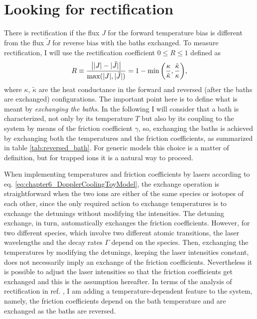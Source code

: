 \section{Looking for rectification\label{sec:lookingForR}}
%
%
There is rectification if the flux $J$  for the forward temperature bias is different from the flux $\tilde{J}$ for reverse bias
with the baths exchanged.  To measure rectification, I will use the rectification coefficient $0\le R\le 1$ defined as
%
\begin{equation}
  R \equiv \frac{\abs{|J|-|\tilde{J}|}}{\max(|J|,|\tilde{J}|)}
  = 1 - \min{ \left( \frac{\kappa}{\tilde{\kappa}} , \frac{\tilde{\kappa}}{\kappa} \right) },
  \label{eq:chapter6_Rectification}
\end{equation}
%
where $\kappa$, $\tilde{\kappa}$ are the heat conductance in the forward and reversed (after the baths are exchanged) configurations. The important point here is to define what is meant by \textit{exchanging the baths}. In the following I will consider that a bath is characterized, not only by its temperature $T$ but also by its coupling  to the system by means of the friction coefficient $\gamma$, so, exchanging the baths is achieved by exchanging both the temperatures and the friction coefficients, as summarized in table \ref{tab:reversed_bath}. For generic models this
choice is a matter of definition, but for trapped ions it is a natural way to proceed.

When implementing temperatures and friction coefficients by lasers according to
eq. \eqref{eq:chapter6_DopplerCoolingToyModel}, the exchange operation is straightforward when the two ions are either of the same species or isotopes of each other, since the only required action to exchange temperatures is to exchange the detunings without modifying the intensities. The detuning exchange, in turn, automatically exchanges the friction coefficients. However, for two different species, which involve two different atomic transitions, the laser wavelengths and the decay rates $\Gamma$ depend on the species. Then, exchanging the temperatures by modifying the detunings, keeping the laser intensities constant, does not necessarily imply an exchange of the friction coefficients. Nevertheless it is possible to adjust the laser intensities so that the friction coefficients get exchanged and this is the assumption hereafter. In terms of the analysis of rectification in ref. \cite{Pereira2017}, I am adding a temperature-dependent feature to the system, namely,  the friction coefficients depend on the bath temperature and are exchanged as the baths are reversed.

